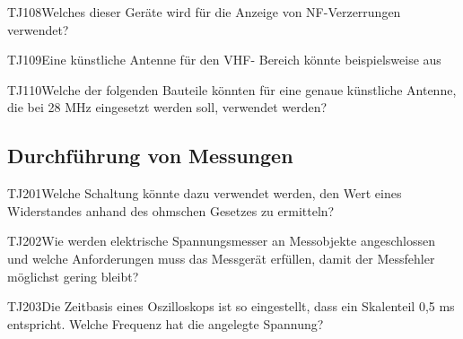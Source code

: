 \begin{question}{TJ108}{Welches dieser Geräte wird für die Anzeige von NF-Verzerrungen verwendet?}
\end{question}

\begin{question}{TJ109}{Eine künstliche Antenne für den VHF- Bereich könnte beispielsweise aus}
\end{question}

\begin{question}{TJ110}{Welche der folgenden Bauteile könnten für eine genaue künstliche Antenne, die bei 28 MHz eingesetzt werden soll, verwendet werden?}
\end{question}

\subsection{Durchführung von Messungen}

\begin{question}{TJ201}{Welche Schaltung könnte dazu verwendet werden, den Wert eines Widerstandes anhand des ohmschen Gesetzes zu ermitteln?}
\end{question}

\begin{question}{TJ202}{Wie werden elektrische Spannungsmesser an Messobjekte angeschlossen und welche Anforderungen muss das Messgerät erfüllen, damit der Messfehler möglichst gering bleibt?}
\end{question}

\begin{question}{TJ203}{Die Zeitbasis eines Oszilloskops ist so eingestellt, dass ein Skalenteil 0,5 ms entspricht. Welche Frequenz hat die angelegte Spannung?}
\end{question}

